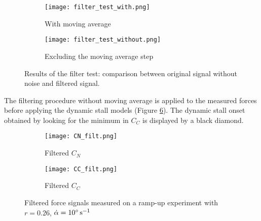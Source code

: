 \begin{figure}[h]
	\begin{subfigure}{.5\textwidth}
		\texttt{[image: filter\_test\_with.png]}
		\caption{With moving average}
		\label{fig:filter_test_with}
	\end{subfigure}%
	\begin{subfigure}{.5\textwidth}
		\texttt{[image: filter\_test\_without.png]}
		\caption{Excluding the moving average step}
		\label{fig:filter_test_without}
	\end{subfigure}
	\caption{Results of the filter test: comparison between original signal without noise and filtered signal.}
\end{figure}

The filtering procedure without moving average is applied to the measured forces before applying the dynamic stall models (Figure \ref{fig:forces_filt}). The dynamic stall onset obtained by looking for the minimum in $C_C$ is displayed by a black diamond. 

\begin{figure}[h]
	\begin{subfigure}{.5\textwidth}
		\texttt{[image: CN\_filt.png]}
		\caption{Filtered $C_N$}
		\label{fig:CN_filt}
	\end{subfigure}%
	\begin{subfigure}{.5\textwidth}
		\texttt{[image: CC\_filt.png]}
		\caption{Filtered $C_C$}
		\label{fig:CC_filt}
	\end{subfigure}
	\caption{Filtered force signals measured on a ramp-up experiment with $r=0.26$, $\dot{\alpha} = 10 \si{\degree \per \second}$}
	\label{fig:forces_filt}
\end{figure}